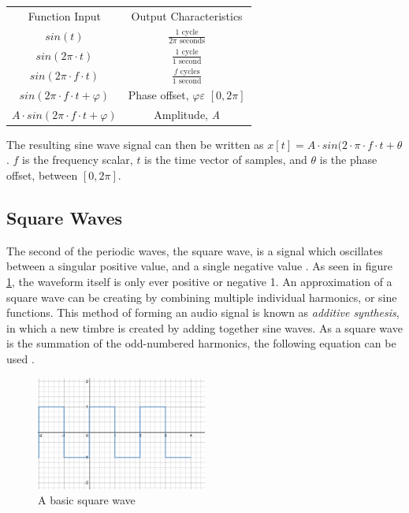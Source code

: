 \begin{center}
    \begin{tabular}{c c}
        Function Input & Output Characteristics \\
        $sin(t)$ & $\frac{1 \textrm{ cycle}}{2\pi \textrm{ seconds}}$\\
        $sin(2\pi \cdot t)$ & $\frac{1 \textrm{ cycle}}{1 \textrm{ second}}$\\
        $sin(2\pi \cdot f \cdot t)$ & $\frac{f \textrm{ cycles}}{1 \textrm{ second}}$\\
        $sin(2\pi \cdot f \cdot t + \varphi)$ & Phase offset, $\varphi \varepsilon$ $[0, 2\pi]$\\
        $A \cdot sin(2\pi \cdot f \cdot t + \varphi)$ & Amplitude, \textit{A}
    \end{tabular}\label{tbl:sin-characteristics}
\end{center}
The resulting sine wave signal can then be written as $x[t] = A \cdot sin(2 \cdot \pi \cdot f \cdot t + \theta$. $f$ is the frequency scalar, $t$ is the time vector of samples, and $\theta$ is the phase offset, between $[0, 2\pi]$.

\subsection{Square Waves}
The second of the periodic waves, the square wave, is a signal which oscillates between a singular positive value, and a single negative value \cite{Tarr_2019}. As seen in figure \ref{fig:square-wave}, the waveform itself is only ever positive or negative 1. An approximation of a square wave can be creating by combining multiple individual harmonics, or sine functions. This method of forming an audio signal is known as \textit{additive synthesis}, in which a new timbre is created by adding together sine waves. As a square wave is the summation of the odd-numbered harmonics, the following equation can be used \cite{Tarr_2019}.

\begin{figure}
  \centering
  \includegraphics[width=0.5\textwidth]{figures/square-wave.png}
  \caption{A basic square wave}
  \label{fig:square-wave}
\end{figure}


